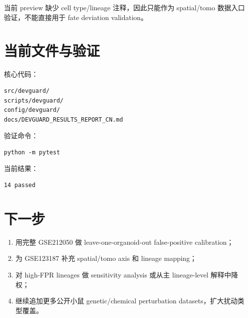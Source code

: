 \documentclass[11pt]{article}
\begin{document}
当前 preview 缺少 cell type/lineage 注释，因此只能作为 spatial/tomo 数据入口验证，不能直接用于 fate deviation validation。

\section*{当前文件与验证}

核心代码：

\begin{verbatim}
src/devguard/
scripts/devguard/
config/devguard/
docs/DEVGUARD_RESULTS_REPORT_CN.md
\end{verbatim}

验证命令：

\begin{verbatim}
python -m pytest
\end{verbatim}

当前结果：

\begin{verbatim}
14 passed
\end{verbatim}

\section*{下一步}

\begin{enumerate}
  \item 用完整 GSE212050 做 leave-one-organoid-out false-positive calibration；
  \item 为 GSE123187 补充 spatial/tomo axis 和 lineage mapping；
  \item 对 high-FPR lineages 做 sensitivity analysis 或从主 lineage-level 解释中降权；
  \item 继续追加更多公开小鼠 genetic/chemical perturbation datasets，扩大扰动类型覆盖。
\end{enumerate}
\end{document}
